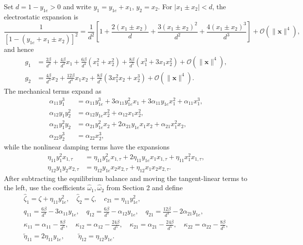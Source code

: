 \documentclass[11pt]{article}
\begin{document}
Set $d=1-y_{1e}>0$ and write $y_1=y_{1e}+x_1$, $y_2=x_2$. For $|x_1\pm x_2|<d$, the electrostatic expansion is
\begin{equation}
\frac{1}{[1-(y_{1e}+x_1\pm x_2)]^2}
=\frac{1}{d^2}\left[1+\frac{2(x_1\pm x_2)}{d}+\frac{3(x_1\pm x_2)^2}{d^2}+\frac{4(x_1\pm x_2)^3}{d^3}\right]+\mathcal{O}(\|\mathbf{x}\|^4),
\end{equation}
and hence
\begin{align*}
g_1&=\frac{2\beta}{d^2}+\frac{4\beta}{d^3}x_1+\frac{6\beta}{d^4}(x_1^2+x_2^2)+\frac{8\beta}{d^5}(x_1^3+3x_1x_2^2)+\mathcal{O}(\|\mathbf{x}\|^4),\\
g_2&=\frac{4\beta}{d^3}x_2+\frac{12\beta}{d^4}x_1x_2+\frac{8\beta}{d^5}(3x_1^2x_2+x_2^3)+\mathcal{O}(\|\mathbf{x}\|^4).
\end{align*}
The mechanical terms expand as
\begin{align*}
\alpha_{11}y_1^3&=\alpha_{11}y_{1e}^3+3\alpha_{11}y_{1e}^2x_1+3\alpha_{11}y_{1e}x_1^2+\alpha_{11}x_1^3,\\
\alpha_{12}y_1y_2^2&=\alpha_{12}y_{1e}x_2^2+\alpha_{12}x_1x_2^2,\\
\alpha_{21}y_1^2y_2&=\alpha_{21}y_{1e}^2x_2+2\alpha_{21}y_{1e}x_1x_2+\alpha_{21}x_1^2x_2,\\
\alpha_{22}y_2^3&=\alpha_{22}x_2^3,
\end{align*}
while the nonlinear damping terms have the expansions
\begin{align*}
\eta_{11}y_1^2x_{1,\tau}&=\eta_{11}y_{1e}^2x_{1,\tau}+2\eta_{11}y_{1e}x_1x_{1,\tau}+\eta_{11}x_1^2x_{1,\tau},\\
\eta_{12}y_1y_2x_{2,\tau}&=\eta_{12}y_{1e}x_2x_{2,\tau}+\eta_{12}x_1x_2x_{2,\tau}.
\end{align*}
After subtracting the equilibrium balance and moving the tangent-linear terms to the left, use the coefficients $\hat\omega_1,\hat\omega_2$ from Section 2 and define
\begin{gather*}
\hat\zeta_1=\zeta+\eta_{11}y_{1e}^2,\quad \hat\zeta_2=\zeta,\quad c_{21}=\eta_{11}y_{1e}^2,\\
q_{11}=\frac{6\beta}{d^4}-3\alpha_{11}y_{1e},\quad q_{12}=\frac{6\beta}{d^4}-\alpha_{12}y_{1e},\quad q_{21}=\frac{12\beta}{d^4}-2\alpha_{21}y_{1e},\\
\kappa_{11}=\alpha_{11}-\frac{8\beta}{d^5},\quad \kappa_{12}=\alpha_{12}-\frac{24\beta}{d^5},\quad
\kappa_{21}=\alpha_{21}-\frac{24\beta}{d^5},\quad \kappa_{22}=\alpha_{22}-\frac{8\beta}{d^5},\\
\widetilde\eta_{11}=2\eta_{11}y_{1e},\qquad \widetilde\eta_{12}=\eta_{12}y_{1e}.
\end{gather*}
\end{document}
